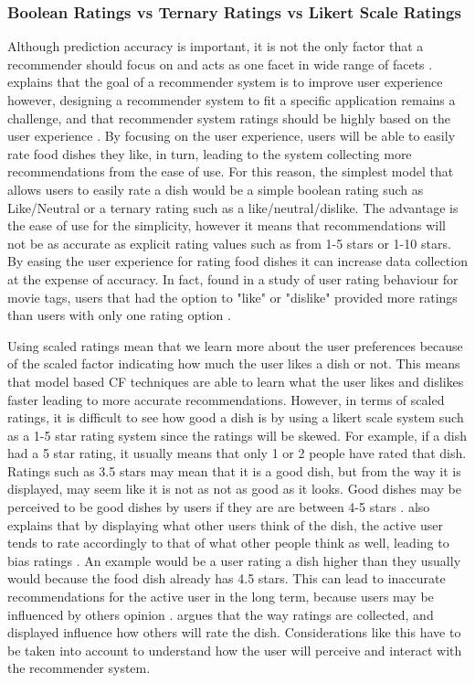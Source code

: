 \subsubsection{Boolean Ratings vs Ternary Ratings vs Likert Scale Ratings}

Although prediction accuracy is important, it is not the only factor that a recommender should focus on and acts as one facet in wide range of facets \cite{martin2009recsys}. \citeauthor{martin2009recsys} explains that the goal of a recommender system is to improve user experience however, designing a recommender system to fit a specific application remains a challenge, and that recommender system ratings should be highly based on the user experience \cite{martin2009recsys}. By focusing on the user experience, users will be able to easily rate food dishes they like, in turn, leading to the system collecting more recommendations from the ease of use. For this reason, the simplest model that allows users to easily rate a dish would be a simple boolean rating such as Like/Neutral or a ternary rating such as a like/neutral/dislike. The advantage is the ease of use for the simplicity, however it means that recommendations will not be as accurate as explicit rating values such as from 1-5 stars or 1-10 stars. By easing the user experience for rating food dishes it can increase data collection at the expense of accuracy. In fact, \citeauthor{movieratings} found in a study of user rating behaviour for movie tags, users that had the option to "like" or "dislike" provided more ratings than users with only one rating option \cite{schafer2007collaborative ,movieratings}. 

Using scaled ratings mean that we learn more about the user preferences because of the scaled factor indicating how much the user likes a dish or not. This means that model based CF techniques are able to learn what the user likes and dislikes faster leading to more accurate recommendations. However, in terms of scaled ratings, it is difficult to see how good a dish is by using a likert scale system such as a 1-5 star rating system since the ratings will be skewed. For example, if a dish had a 5 star rating, it usually means that only 1 or 2 people have rated that dish. Ratings such as 3.5 stars may mean that it is a good dish, but from the way it is displayed, may seem like it is not as not as good as it looks. Good dishes may be perceived to be good dishes by users if they are are between 4-5 stars \cite{recommendable}. \citeauthor{interface} also explains that by displaying what other users think of the dish, the active user tends to rate accordingly to that of what other people think as well, leading to bias ratings \cite{interface}. An example would be a user rating a dish higher than they usually would because the food dish already has 4.5 stars. This can lead to inaccurate recommendations for the active user in the long term, because users may be influenced by others opinion \cite{interface}. \citeauthor{interface} argues that the way ratings are collected, and displayed influence how others will rate the dish. Considerations like this have to be taken into account to understand how the user will perceive and interact with the recommender system.  


